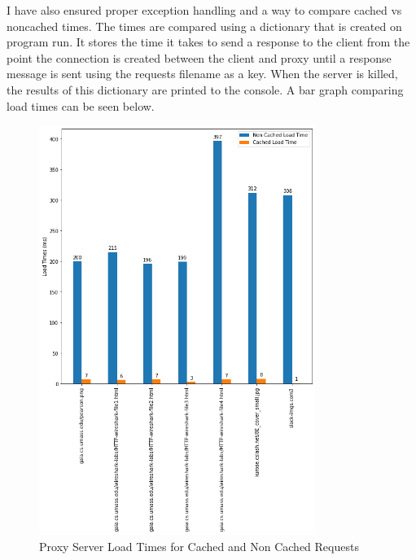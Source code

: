 \documentclass[11pt]{article}
\begin{document}
    I have also ensured proper exception handling and a way to compare cached vs noncached times. The times are compared using a dictionary that is created on program run. It stores the time it takes to send a response to the client from the point the connection is created between the client and proxy until a response message is sent using the requests filename as a key. When the server is killed, the results of this dictionary are printed to the console. A bar graph comparing load times can be seen below. \\

\begin{figure}
    \centering
    \includegraphics[width=0.8\textwidth]{img/proxy_server_load_times_graph.png}
    \caption{Proxy Server Load Times for Cached and Non Cached Requests}
    \label{fig:my_label}
\end{figure}
\end{document}
